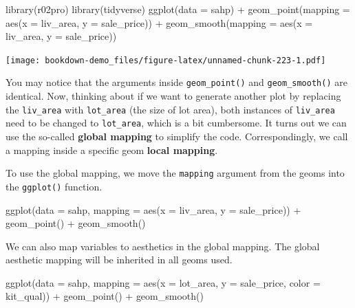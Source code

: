 \documentclass[
]{book}
\newenvironment{Shaded}{\begin{snugshade}}{\end{snugshade}}
\newcommand{\AttributeTok}[1]{\textcolor[rgb]{0.77,0.63,0.00}{#1}}
\newcommand{\FunctionTok}[1]{\textcolor[rgb]{0.00,0.00,0.00}{#1}}
\newcommand{\NormalTok}[1]{#1}
\newcommand{\SpecialCharTok}[1]{\textcolor[rgb]{0.00,0.00,0.00}{#1}}
\begin{document}
\begin{Shaded}
\begin{Highlighting}[]
\FunctionTok{library}\NormalTok{(r02pro)}
\FunctionTok{library}\NormalTok{(tidyverse)}
\FunctionTok{ggplot}\NormalTok{(}\AttributeTok{data =}\NormalTok{ sahp) }\SpecialCharTok{+} \FunctionTok{geom\_point}\NormalTok{(}\AttributeTok{mapping =} \FunctionTok{aes}\NormalTok{(}\AttributeTok{x =}\NormalTok{ liv\_area, }\AttributeTok{y =}\NormalTok{ sale\_price)) }\SpecialCharTok{+} \FunctionTok{geom\_smooth}\NormalTok{(}\AttributeTok{mapping =} \FunctionTok{aes}\NormalTok{(}\AttributeTok{x =}\NormalTok{ liv\_area, }\AttributeTok{y =}\NormalTok{ sale\_price))}
\end{Highlighting}
\end{Shaded}

\texttt{[image: bookdown-demo\_files/figure-latex/unnamed-chunk-223-1.pdf]}

You may notice that the arguments inside \texttt{geom\_point()} and \texttt{geom\_smooth()} are identical. Now, thinking about if we want to generate another plot by replacing the \texttt{liv\_area} with \texttt{lot\_area} (the size of lot area), both instances of \texttt{liv\_area} need to be changed to \texttt{lot\_area}, which is a bit cumbersome. It turns out we can use the so-called \textbf{global mapping} to simplify the code. Correspondingly, we call a mapping inside a specific geom \textbf{local mapping}.

To use the global mapping, we move the \texttt{mapping} argument from the geoms into the \texttt{ggplot()} function.

\begin{Shaded}
\begin{Highlighting}[]
\FunctionTok{ggplot}\NormalTok{(}\AttributeTok{data =}\NormalTok{ sahp, }\AttributeTok{mapping =} \FunctionTok{aes}\NormalTok{(}\AttributeTok{x =}\NormalTok{ liv\_area, }\AttributeTok{y =}\NormalTok{ sale\_price)) }\SpecialCharTok{+} \FunctionTok{geom\_point}\NormalTok{() }\SpecialCharTok{+} \FunctionTok{geom\_smooth}\NormalTok{()}
\end{Highlighting}
\end{Shaded}

We can also map variables to aesthetics in the global mapping. The global aesthetic mapping will be inherited in all geoms used.

\begin{Shaded}
\begin{Highlighting}[]
\FunctionTok{ggplot}\NormalTok{(}\AttributeTok{data =}\NormalTok{ sahp, }\AttributeTok{mapping =} \FunctionTok{aes}\NormalTok{(}\AttributeTok{x =}\NormalTok{ lot\_area, }\AttributeTok{y =}\NormalTok{ sale\_price, }\AttributeTok{color =}\NormalTok{ kit\_qual)) }\SpecialCharTok{+} \FunctionTok{geom\_point}\NormalTok{() }\SpecialCharTok{+} \FunctionTok{geom\_smooth}\NormalTok{()}
\end{Highlighting}
\end{Shaded}
\end{document}

